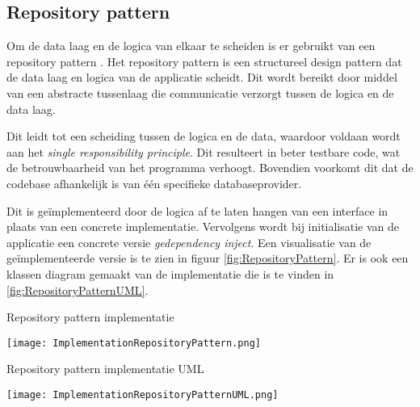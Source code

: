 \subsection{Repository pattern}
Om de data laag en de logica van elkaar te scheiden is er gebruikt van een repository pattern \parencite{RepositoryPattern}.
Het repository pattern is een structureel design pattern dat de data laag en logica van de applicatie scheidt.
Dit wordt bereikt door middel van een abstracte tussenlaag die communicatie verzorgt tussen de logica en de data laag.

\whitespace
Dit leidt tot een scheiding tussen de logica en de data, waardoor voldaan wordt aan het \textit{single responsibility principle}.
Dit resulteert in beter testbare code, wat de betrouwbaarheid van het programma verhoogt.
Bovendien voorkomt dit dat de codebase afhankelijk is van één specifieke databaseprovider.

\whitespace
Dit is geïmplementeerd door de logica af te laten hangen van een interface in plaats van een concrete implementatie.
Vervolgens wordt bij initialisatie van de applicatie  een concrete versie \textit{gedependency inject}.
Een visualisatie van de geïmplementeerde versie is te zien in figuur \ref{fig:RepositoryPattern}.
Er is ook een klassen diagram gemaakt van de implementatie die is te vinden in \ref{fig:RepositoryPatternUML}.

\whitespace[2]
\begin{graphic}
    \captionsetup{type=figure}
    \caption{Repository pattern implementatie}
    \texttt{[image: ImplementationRepositoryPattern.png]}
    \label{fig:RepositoryPattern}
\end{graphic}

\begin{graphic}
    \captionsetup{type=figure}
    \caption{Repository pattern implementatie UML}
    \texttt{[image: ImplementationRepositoryPatternUML.png]}
    \label{fig:RepositoryPatternUML}
\end{graphic}
